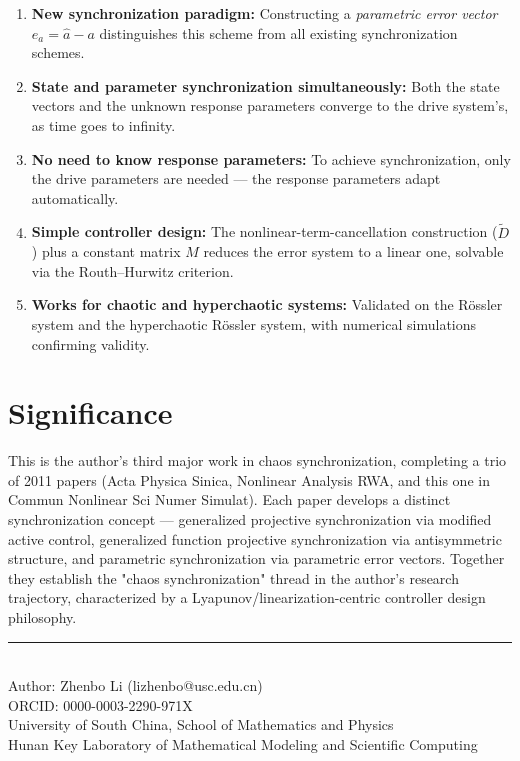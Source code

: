 \documentclass[11pt,a4paper]{article}
\begin{document}
\begin{enumerate}[leftmargin=2em]
\item \textbf{New synchronization paradigm:} Constructing a \emph{parametric error vector} $e_a = \hat a - a$ distinguishes this scheme from all existing synchronization schemes.

\item \textbf{State and parameter synchronization simultaneously:} Both the state vectors and the unknown response parameters converge to the drive system's, as time goes to infinity.

\item \textbf{No need to know response parameters:} To achieve synchronization, only the drive parameters are needed --- the response parameters adapt automatically.

\item \textbf{Simple controller design:} The nonlinear-term-cancellation construction ($\tilde D$) plus a constant matrix $M$ reduces the error system to a linear one, solvable via the Routh--Hurwitz criterion.

\item \textbf{Works for chaotic and hyperchaotic systems:} Validated on the R\"ossler system and the hyperchaotic R\"ossler system, with numerical simulations confirming validity.
\end{enumerate}

\section{Significance}

This is the author's third major work in chaos synchronization, completing a trio of 2011 papers (Acta Physica Sinica, Nonlinear Analysis RWA, and this one in Commun Nonlinear Sci Numer Simulat). Each paper develops a distinct synchronization concept --- generalized projective synchronization via modified active control, generalized function projective synchronization via antisymmetric structure, and parametric synchronization via parametric error vectors. Together they establish the "chaos synchronization" thread in the author's research trajectory, characterized by a Lyapunov/linearization-centric controller design philosophy.

\vfill
\begin{center}
\small\rule{0.5\textwidth}{0.3pt}\\[4pt]
\small\color{primary} Author: Zhenbo Li (lizhenbo@usc.edu.cn)\\
\small ORCID: 0000-0003-2290-971X\\
\small University of South China, School of Mathematics and Physics\\
\small Hunan Key Laboratory of Mathematical Modeling and Scientific Computing
\end{center}
\end{document}
